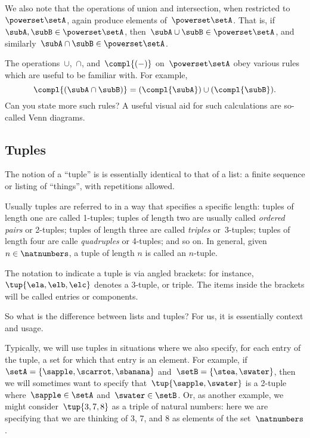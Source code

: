 We also note that the operations of union and intersection, when restricted to~$\powerset \setA$, again produce elements of~$\powerset \setA$.
That is, if~$\subA, \subB \in \powerset \setA$, then~$\subA \cup \subB \in \powerset \setA$, and similarly~$\subA \cap \subB \in \powerset \setA$.

The operations~$\cup$,~$\cap$, and~$\compl{( - )}$ on~$\powerset \setA$ obey various rules which are useful to be familiar with.
For example,
\begin{equation*}
    \compl{(\subA \cap \subB)} = (\compl{\subA}) \cup (\compl{\subB}).
\end{equation*}
Can you state more such rules?
A useful visual aid for such calculations are so-called Venn diagrams.


\subsection{Tuples}

The notion of a ``tuple'' is is essentially identical to that of a list: a finite sequence or listing of ``things'', with repetitions allowed.

Usually tuples are referred to in a way that specifies a specific length: tuples of length one are called 1-tuples; tuples of length two are usually called \emph{ordered pairs} or 2-tuples; tuples of length three are called \emph{triples} or~3-tuples; tuples of length four are calle \emph{quadruples} or 4-tuples; and so on.
In general, given~$n \in \natnumbers$, a tuple of length $n$ is called an $n$-tuple.

The notation to indicate a tuple is via angled brackets: for instance,~$\tup{\ela, \elb, \elc}$ denotes a 3-tuple, or triple.
The items inside the brackets will be called entries or components.

So what is the difference between lists and tuples?
For us, it is essentially context and usage.

Typically, we will use tuples in situations where we also specify, for each entry of the tuple, a set for which that entry is an element.
For example, if~$\setA = \{ \sapple, \scarrot, \sbanana \}$ and~$\setB = \{ \stea, \swater \}$, then we will sometimes want to specify that~$\tup{\sapple, \swater}$ is a 2-tuple where~$\sapple \in \setA$ and~$\swater \in \setB$.
Or, as another example, we might consider~$\tup{3, 7, 8}$ as a triple of natural numbers: here we are specifying that we are thinking of 3, 7, and 8 as elements of the set~$\natnumbers$.

